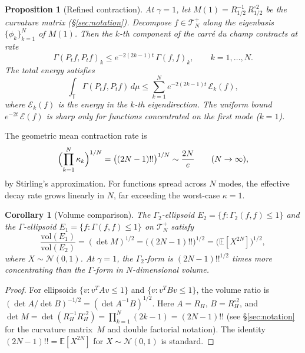 \documentclass[11pt,a4paper]{article}
\theoremstyle{plain}
\newtheorem{proposition}[theorem]{Proposition}
\newtheorem{corollary}[theorem]{Corollary}
\theoremstyle{definition}
\theoremstyle{remark}
\newcommand{\E}{\mathbb{E}}
\newcommand{\T}{\mathbb{T}}
\begin{document}
\begin{proposition}[Refined contraction]\label{prop:refined}
At $\gamma = 1$, let $M(1) = R_{1/2}^{-1}\,R_{1/2}^{\circ 2}$
be the curvature matrix (\S\ref{sec:notation}).
Decompose $f \in \mathcal{T}_N^+$ along the
eigenbasis $\{\phi_k\}_{k=1}^N$ of $M(1)$.
Then the $k$-th component of the carr\'e du champ contracts at rate
\begin{equation}\label{eq:refined-contraction}
  \Gamma(P_t f, P_t f)_k \leq e^{-2(2k-1)t}\,\Gamma(f,f)_k,
  \qquad k = 1,\ldots,N.
\end{equation}
The total energy satisfies
\begin{equation}\label{eq:total-energy}
  \int_\T \Gamma(P_t f, P_t f)\,d\mu
  \leq \sum_{k=1}^N e^{-2(2k-1)t}\,\mathcal{E}_k(f),
\end{equation}
where $\mathcal{E}_k(f)$ is the energy in the $k$-th eigendirection.
The uniform bound $e^{-2t}\,\mathcal{E}(f)$ is sharp only for
functions concentrated on the first mode ($k=1$).
\end{proposition}

The geometric mean contraction rate is
\[
  \Bigl(\prod_{k=1}^N \kappa_k\Bigr)^{1/N}
  = \bigl((2N-1)!!\bigr)^{1/N} \sim \frac{2N}{e}
  \qquad (N \to \infty),
\]
by Stirling's approximation.
For functions spread across $N$ modes, the effective decay rate
grows linearly in $N$, far exceeding the worst-case $\kappa = 1$.

\begin{corollary}[Volume comparison]\label{cor:volume}
The $\Gamma_2$-ellipsoid
$E_2 = \{f : \Gamma_2(f,f) \leq 1\}$ and the $\Gamma$-ellipsoid
$E_1 = \{f : \Gamma(f,f) \leq 1\}$ on $\mathcal{T}_N^+$ satisfy
\begin{equation}\label{eq:volume-ratio}
  \frac{\mathrm{vol}(E_1)}{\mathrm{vol}(E_2)}
  = (\det M)^{1/2} = \bigl((2N-1)!!\bigr)^{1/2}
  = \bigl(\E[X^{2N}]\bigr)^{1/2},
\end{equation}
where $X \sim \mathcal{N}(0,1)$.
At $\gamma = 1$, the $\Gamma_2$-form is $(2N-1)!!^{1/2}$ times
more concentrating than the $\Gamma$-form in $N$-dimensional volume.
\end{corollary}

\begin{proof}
For ellipsoids $\{v : v^T A v \leq 1\}$ and $\{v : v^T B v \leq 1\}$,
the volume ratio is $(\det A / \det B)^{-1/2} = (\det A^{-1}B)^{1/2}$.
Here $A = R_H$, $B = R_H^{\circ 2}$, and
$\det M = \det(R_H^{-1}R_H^{\circ 2})
= \prod_{k=1}^N(2k-1) = (2N-1)!!$
(see \S\ref{sec:notation} for the curvature matrix~$M$ and
double factorial notation).
The identity $(2N-1)!! = \E[X^{2N}]$ for $X \sim \mathcal{N}(0,1)$
is standard.
\end{proof}
\end{document}
